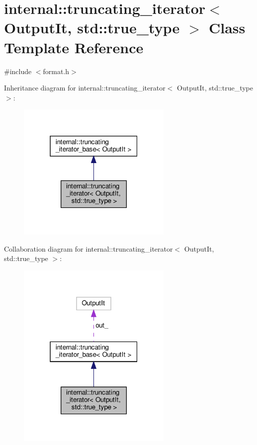 \hypertarget{classinternal_1_1truncating__iterator_3_01_output_it_00_01std_1_1true__type_01_4}{}\section{internal\+:\+:truncating\+\_\+iterator$<$ Output\+It, std\+:\+:true\+\_\+type $>$ Class Template Reference}
\label{classinternal_1_1truncating__iterator_3_01_output_it_00_01std_1_1true__type_01_4}


{\ttfamily \#include $<$format.\+h$>$}



Inheritance diagram for internal\+:\+:truncating\+\_\+iterator$<$ Output\+It, std\+:\+:true\+\_\+type $>$\+:
\nopagebreak
\begin{figure}[H]
\begin{center}
\leavevmode
\includegraphics[width=211pt]{classinternal_1_1truncating__iterator_3_01_output_it_00_01std_1_1true__type_01_4__inherit__graph}
\end{center}
\end{figure}


Collaboration diagram for internal\+:\+:truncating\+\_\+iterator$<$ Output\+It, std\+:\+:true\+\_\+type $>$\+:
\nopagebreak
\begin{figure}[H]
\begin{center}
\leavevmode
\includegraphics[width=211pt]{classinternal_1_1truncating__iterator_3_01_output_it_00_01std_1_1true__type_01_4__coll__graph}
\end{center}
\end{figure}
